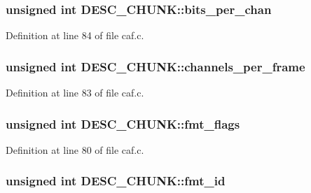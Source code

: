 \subsubsection[{\texorpdfstring{bits\+\_\+per\+\_\+chan}{bits_per_chan}}]{\setlength{\rightskip}{0pt plus 5cm}unsigned {\bf int} D\+E\+S\+C\+\_\+\+C\+H\+U\+N\+K\+::bits\+\_\+per\+\_\+chan}\hypertarget{struct_d_e_s_c___c_h_u_n_k_a6b223bee56f5fb26f69018e4487225a1}{}\label{struct_d_e_s_c___c_h_u_n_k_a6b223bee56f5fb26f69018e4487225a1}


Definition at line 84 of file caf.\+c.

\subsubsection[{\texorpdfstring{channels\+\_\+per\+\_\+frame}{channels_per_frame}}]{\setlength{\rightskip}{0pt plus 5cm}unsigned {\bf int} D\+E\+S\+C\+\_\+\+C\+H\+U\+N\+K\+::channels\+\_\+per\+\_\+frame}\hypertarget{struct_d_e_s_c___c_h_u_n_k_a2d7c4f6b04f9de87cf6e1331a8e5322c}{}\label{struct_d_e_s_c___c_h_u_n_k_a2d7c4f6b04f9de87cf6e1331a8e5322c}


Definition at line 83 of file caf.\+c.

\subsubsection[{\texorpdfstring{fmt\+\_\+flags}{fmt_flags}}]{\setlength{\rightskip}{0pt plus 5cm}unsigned {\bf int} D\+E\+S\+C\+\_\+\+C\+H\+U\+N\+K\+::fmt\+\_\+flags}\hypertarget{struct_d_e_s_c___c_h_u_n_k_aee7da3fdf0b72a282cceda4930fe08e4}{}\label{struct_d_e_s_c___c_h_u_n_k_aee7da3fdf0b72a282cceda4930fe08e4}


Definition at line 80 of file caf.\+c.

\subsubsection[{\texorpdfstring{fmt\+\_\+id}{fmt_id}}]{\setlength{\rightskip}{0pt plus 5cm}unsigned {\bf int} D\+E\+S\+C\+\_\+\+C\+H\+U\+N\+K\+::fmt\+\_\+id}\hypertarget{struct_d_e_s_c___c_h_u_n_k_ad1c40e858aef37d2e4eebf7db7a47bc1}{}\label{struct_d_e_s_c___c_h_u_n_k_ad1c40e858aef37d2e4eebf7db7a47bc1}


